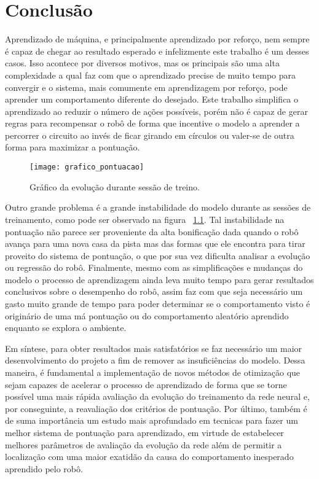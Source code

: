 

\chapter{Conclusão}
\label{cap:conclusao}

Aprendizado de máquina, e principalmente aprendizado por reforço, nem sempre é capaz de chegar ao resultado esperado e infelizmente este trabalho é um desses casos. Isso acontece por diversos motivos, mas os principais são uma alta complexidade a qual faz com que o aprendizado precise de muito tempo para convergir e o sistema, mais comumente em aprendizagem por reforço, pode aprender um comportamento diferente do desejado. Este trabalho simplifica o aprendizado ao reduzir o número de ações possíveis, porém não é capaz de gerar regras para recompensar o robô de forma que incentive o modelo a aprender a percorrer o circuito ao invés de ficar girando em círculos ou valer-se de outra forma para maximizar a pontuação.

\begin{figure}
	\centering
	\texttt{[image: grafico\_pontuacao]}
	\caption{Gráfico da evolução durante sessão de treino. \label{fig:grafico_pontuacao}}
\end{figure}

Outro grande problema é a grande instabilidade do modelo durante as sessões de treinamento, como pode ser observado na figura ~\ref{fig:grafico_pontuacao}. Tal instabilidade na pontuação não parece ser proveniente da alta bonificação dada quando o robô avança para uma nova casa da pista mas das formas que ele encontra para tirar proveito do sistema de pontuação, o que por sua vez dificulta analisar a evolução ou regressão do robô. Finalmente, mesmo com as simplificações e mudanças do modelo o processo de aprendizagem ainda leva muito tempo para gerar resultados conclusivos sobre o desempenho do robô, assim faz com que seja necessário um gasto muito grande de tempo para poder determinar se o comportamento visto é originário de uma má pontuação ou do comportamento aleatório aprendido enquanto se explora o ambiente.

Em síntese, para obter resultados mais satisfatórios se faz necessário um maior desenvolvimento do projeto a fim de remover as insuficiências do modelo. Dessa maneira, é fundamental a implementação de novos métodos de otimização que sejam capazes de acelerar o processo de aprendizado de forma que se torne possível uma mais rápida avaliação da evolução do treinamento da rede neural e, por conseguinte, a reavaliação dos critérios de pontuação. Por último, também é de suma importância um estudo mais aprofundado em tecnicas para fazer um melhor sistema de pontuação para aprendizado, em virtude de estabelecer melhores parâmetros de avaliação da evolução da rede além de permitir a localização com uma maior exatidão da causa do comportamento inesperado aprendido pelo robô.

